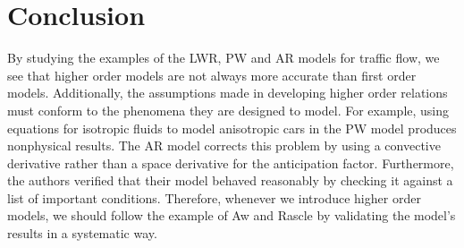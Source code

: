 \documentclass{article}
\begin{document}
\section{Conclusion}
By studying the examples of the LWR, PW and AR models for traffic flow, we see that higher order models are not always more accurate than first order models.  Additionally, the assumptions made in developing higher order relations must conform to the phenomena they are designed to model.  For example, using equations for isotropic fluids to model anisotropic cars in the PW model produces nonphysical results.  The AR model corrects this problem by using a convective derivative rather than a space derivative for the anticipation factor.  Furthermore, the authors verified that their model behaved reasonably by checking it against a list of important conditions.  Therefore, whenever we introduce higher order models, we should follow the example of Aw and Rascle by validating the model's results in a systematic way.  

{}

\end{document}
